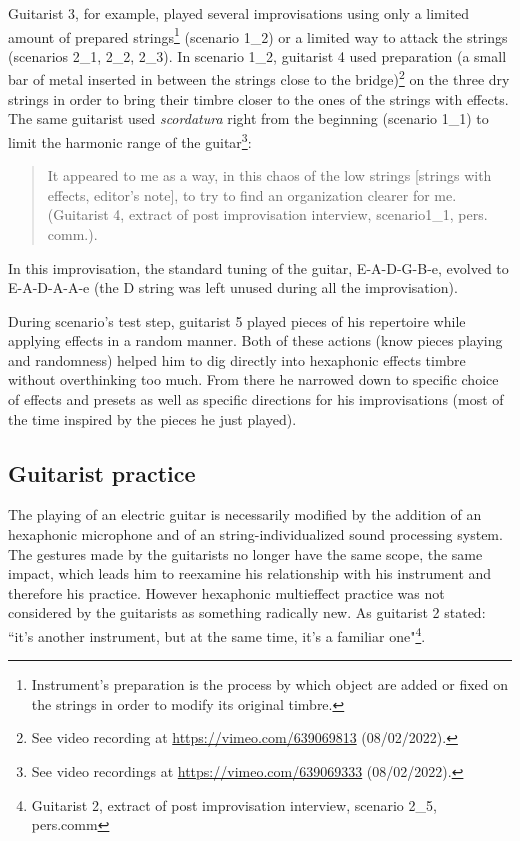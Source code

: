 \documentclass{article}
\begin{document}
Guitarist 3, for example, played several improvisations using only a limited amount of prepared strings\footnote{Instrument's preparation is the process by which object are added or fixed on the strings in order to modify its original timbre.} (scenario 1\_2) or a limited way to attack the strings (scenarios 2\_1, 2\_2, 2\_3). In scenario 1\_2, guitarist 4 used preparation (a small bar of metal inserted in between the strings close to the bridge)\footnote{See video recording at \url{https://vimeo.com/639069813} (08/02/2022).} on the three dry strings in order to bring their timbre closer to the ones of the strings with effects. The same guitarist used \textit{scordatura} right from the beginning (scenario 1\_1) to limit the harmonic range of the guitar\footnote{See video recordings at \url{https://vimeo.com/639069333} (08/02/2022).}:
    \begin{quote}
     It appeared to me as a way, in this chaos of the low strings [strings with effects, editor's note], to try to find an organization clearer for me. (Guitarist 4, extract of post improvisation interview, scenario1\_1, pers. comm.).
    \end{quote}
In this improvisation, the standard tuning of the guitar, E-A-D-G-B-e, evolved to E-A-D-A-A-e (the D string was left unused during all the improvisation). 

During scenario's test step, guitarist 5 played pieces of his repertoire while applying effects in a random manner. Both of these actions (know pieces playing and randomness) helped him to dig directly into hexaphonic effects timbre without overthinking too much. From there he narrowed down to specific choice of effects and presets as well as specific directions for his improvisations (most of the time inspired by the pieces he just played). 

\subsection{Guitarist practice}
The playing of an electric guitar is necessarily modified by the addition of an hexaphonic microphone and of an string-individualized sound processing system. The gestures made by the guitarists no longer have the same scope, the same impact, which leads him to reexamine his relationship with his instrument and therefore his practice.
However hexaphonic multieffect practice was not considered by the guitarists as something radically new.  As guitarist 2 stated: ``it's another instrument, but at the same time, it's a familiar one"\footnote{Guitarist 2, extract of post improvisation interview,  scenario 2\_5, pers.comm}. 
\end{document}
